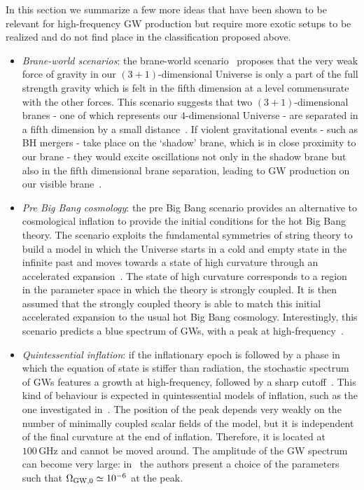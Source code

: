 \documentclass[11pt,a4paper]{article}
\begin{document}
In this section we summarize a few more ideas that have been shown to be relevant for high-frequency GW production but require more exotic setups to be realized and do not find place in the classification proposed above.

\begin{itemize}
    \item \textit{Brane-world scenarios}: the brane-world scenario~\cite{Rubakov:1983bb} proposes that the very weak force of gravity in our $(3+1)$-dimensional Universe is only a part of the full strength gravity which is felt in the fifth dimension at a level commensurate with the other forces. This scenario suggests that two $(3+1)$-dimensional branes - one of which represents our $4$-dimensional Universe - are separated in a fifth dimension by a small distance~\cite{Randall:1998uk, Maartens:2010ar}. If violent gravitational events - such as BH mergers - take place on the `shadow' brane, which is in close proximity to our brane - they would excite oscillations not only in the shadow brane but also in the fifth dimensional brane separation, leading to GW production on our visible brane~\cite{Seahra1, Seahra2}.
    \item \textit{Pre Big Bang cosmology}: the pre Big Bang scenario provides an alternative to cosmological inflation to provide the initial conditions for the hot Big Bang theory. The scenario exploits the fundamental symmetries of string theory to build a model in which the Universe starts in a cold and empty state in the infinite past and moves towards a state of high curvature through an accelerated expansion~\cite{Gasperini:2002bn, Gasperini:2007vw}. The state of high curvature corresponds to a region in the parameter space in which the theory is strongly coupled. It is then assumed that the strongly coupled theory is able to match this initial accelerated expansion to the usual hot Big Bang cosmology. Interestingly, this scenario predicts a blue spectrum of GWs, with a peak at high-frequency~\cite{Brustein:1995ki}.
    \item \textit{Quintessential inflation}: if the inflationary epoch is followed by a phase in which the equation of state is stiffer than radiation, the stochastic spectrum of GWs features a growth at high-frequency, followed by a sharp cutoff~\cite{Giovannini:1999bh}. This kind of behaviour is expected in quintessential models of inflation, such as the one investigated in~\cite{Peebles:1998qn}. The position of the peak depends very weakly on the number of minimally coupled scalar fields of the model, but it is independent of the final curvature at the end of inflation. Therefore, it is located at $100 \, \text{GHz}$ and cannot be moved around. The amplitude of the GW spectrum can become very large: in~\cite{Giovannini:1999bh} the authors present a choice of the parameters such that $\Omega_{\rm GW, 0} \simeq 10^{-6}$ at the peak.

\end{itemize}
\end{document}
